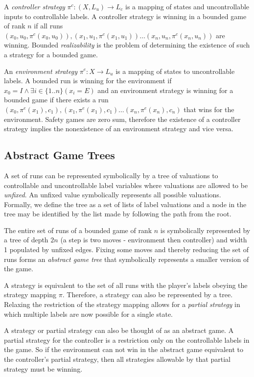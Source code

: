 \documentclass{llncs}
\begin{document}
A \emph{controller strategy} $\pi^c : (X, L_u) \to L_c$ is a mapping of states
and uncontrollable inputs to controllable labels. A controller strategy is
winning in a bounded game of rank $n$ if all runs $(x_0, u_0, \pi^c(x_0, u_0)),
(x_1, u_1, \pi^c(x_1, u_1)) \dots (x_n, u_n, \pi^c(x_n, u_n))$ are winning.
Bounded \emph{realizability} is the problem of determining the existence of
such a strategy for a bounded game.

An \emph{environment strategy} $\pi^e : X \to L_u$ is a mapping of states to
uncontrollable labels. A bounded run is winning for the environment if $x_0
= I \land \exists i \in \{1..n\} (x_i = E)$ and an environment strategy is
winning for a bounded game if there exists a run $(x_0, \pi^e(x_1), c_1), (x_1,
\pi^e(x_1), c_1) \dots (x_n, \pi^e(x_n), c_n)$ that wins for the environment.
Safety games are zero sum, therefore the existence of a controller strategy
implies the nonexistence of an environment strategy and vice versa.

\subsection{Abstract Game Trees}

A set of runs can be represented symbolically by a tree of valuations to
controllable and uncontrollable label variables where valuations are allowed to
be \emph{unfixed}. An unfixed value symbolically represents all possible
valuations. Formally, we define the tree as a set of lists of label valuations
and a node in the tree may be identified by the list made by following the path
from the root.

The entire set of runs of a bounded game of rank $n$ is symbolically
represented by a tree of depth $2n$ (a step is two moves - environment then
controller) and width 1 populated by unfixed edges.  Fixing some moves and
thereby reducing the set of runs forms an \emph{abstract game tree} that
symbolically represents a smaller version of the game.

A strategy is equivalent to the set of all runs with the player's labels
obeying the strategy mapping $\pi$. Therefore, a strategy can also be
represented by a tree. Relaxing the restriction of the strategy mapping allows
for a \emph{partial strategy} in which multiple labels are now possible for a
single state.

A strategy or partial strategy can also be thought of as an abstract game. A
partial strategy for the controller is a restriction only on the controllable
labels in the game. So if the environment can not win in the abstract game
equivalent to the controller's partial strategy, then all strategies allowable
by that partial strategy must be winning.
\end{document}

